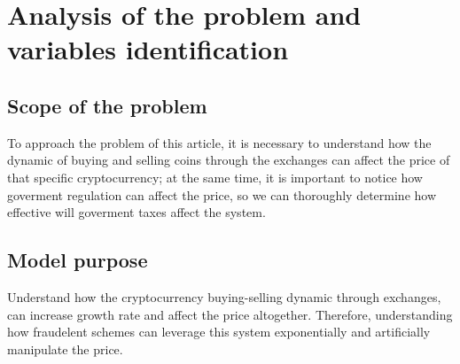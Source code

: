 \section{Analysis of the problem and variables identification}
\subsection{Scope of the problem}
To approach the problem of this article, it is necessary to understand how the dynamic of buying and selling coins through the exchanges can affect the price of that specific cryptocurrency; at the same time, it is important to notice how goverment regulation can affect the price, so we can thoroughly determine how effective will goverment taxes affect the system.

\subsection{Model purpose}
Understand how the cryptocurrency buying-selling dynamic through exchanges, can increase growth rate and affect the price altogether. Therefore, understanding how fraudelent schemes can leverage this system exponentially and artificially manipulate the price.

